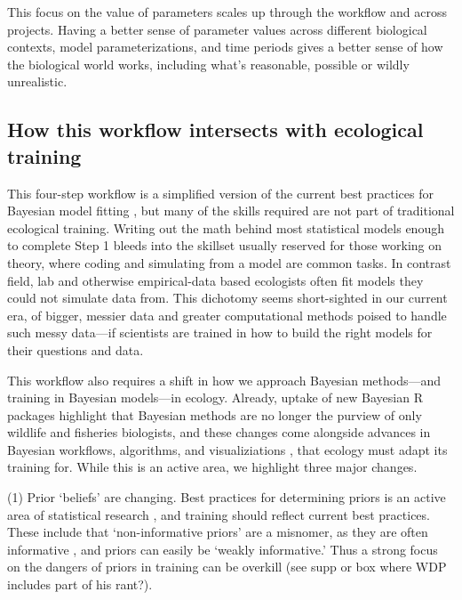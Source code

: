 \documentclass[11pt]{article}
\begin{document}
This focus on the value of parameters scales up through the workflow and across projects. Having a better sense of parameter values across different biological contexts, model parameterizations, and time periods gives a better sense of how the biological world works, including what's reasonable, possible or wildly unrealistic. %

\subsection{How this workflow intersects with ecological training} %

This four-step workflow is a simplified version of the current best practices for Bayesian model fitting  \citep{betanworkflow,vandeschoot2021}, but many of the skills required are not part of traditional ecological training. Writing out the math behind most statistical models enough to complete Step 1 bleeds into the skillset usually reserved for those working on theory, where coding and simulating from a model are common tasks. In contrast field, lab and otherwise empirical-data based ecologists often fit models they could not simulate data from. This dichotomy seems short-sighted in our current era, of bigger, messier data and greater computational methods poised to handle such messy data---if scientists are trained in how to build the right models for their questions and data. %

This workflow also requires a shift in how we approach Bayesian methods---and training in Bayesian models---in ecology. Already, uptake of new Bayesian \textsf{R} packages highlight that Bayesian methods are no longer the purview of only wildlife and fisheries biologists, and these changes come alongside advances in Bayesian workflows, algorithms, and visualiziations \citep[e.g.][]{betanworkflow,vandeschoot2021,gabryvis}, that ecology must adapt its training for. While this is an active area, we highlight three major changes.

(1) Prior `beliefs' are changing. Best practices for determining priors is an active area of statistical research \citep{BDA,regotherstories}, and training should reflect current best practices. These include that `non-informative priors' are a misnomer, as they are often informative  \citep{lemoine2019}, and priors can easily be `weakly informative.' Thus a strong focus on the dangers of priors in training can be overkill (see supp or box where WDP includes part of his rant?). 
\end{document}
